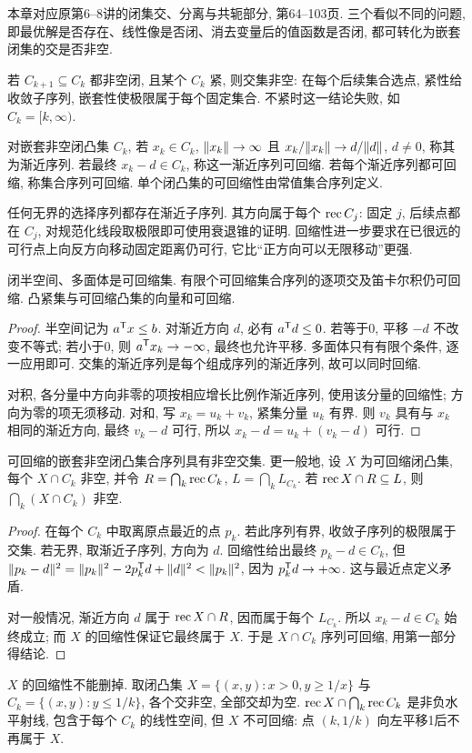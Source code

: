 \label{chap:3}
本章对应原第6--8讲的闭集交、分离与共轭部分, 第64--103页. 三个看似不同的问题, 即最优解是否存在、线性像是否闭、消去变量后的值函数是否闭, 都可转化为嵌套闭集的交是否非空.

若 $C_{k+1}\subseteq C_k$ 都非空闭, 且某个 $C_k$ 紧, 则交集非空: 在每个后续集合选点, 紧性给收敛子序列, 嵌套性使极限属于每个固定集合. 不紧时这一结论失败, 如 $C_k=[k,\infty)$.

\begin{definition}
对嵌套非空闭凸集 $C_k$, 若 $x_k\in C_k$, $\lVert x_k\rVert\to\infty$ 且 $x_k/\lVert x_k\rVert\to d/\lVert d\rVert$, $d\ne0$, 称其为渐近序列. 若最终 $x_k-d\in C_k$, 称这一渐近序列可回缩. 若每个渐近序列都可回缩, 称集合序列可回缩. 单个闭凸集的可回缩性由常值集合序列定义.
\end{definition}
任何无界的选择序列都存在渐近子序列. 其方向属于每个 $\operatorname{rec} C_j$: 固定 $j$, 后续点都在 $C_j$, 对规范化线段取极限即可使用衰退锥的证明. 回缩性进一步要求在已很远的可行点上向反方向移动固定距离仍可行, 它比“正方向可以无限移动”更强.

\begin{lemma}
闭半空间、多面体是可回缩集. 有限个可回缩集合序列的逐项交及笛卡尔积仍可回缩. 凸紧集与可回缩凸集的向量和可回缩.
\end{lemma}
\begin{proof}
半空间记为 $a^{\mathsf T} x\le b$. 对渐近方向 $d$, 必有 $a^{\mathsf T} d\le0$. 若等于0, 平移 $-d$ 不改变不等式; 若小于0, 则 $a^{\mathsf T} x_k\to-\infty$, 最终也允许平移. 多面体只有有限个条件, 逐一应用即可. 交集的渐近序列是每个组成序列的渐近序列, 故可以同时回缩.

对积, 各分量中方向非零的项按相应增长比例作渐近序列, 使用该分量的回缩性; 方向为零的项无须移动. 对和, 写 $x_k=u_k+v_k$, 紧集分量 $u_k$ 有界. 则 $v_k$ 具有与 $x_k$ 相同的渐近方向, 最终 $v_k-d$ 可行, 所以 $x_k-d=u_k+(v_k-d)$ 可行.
\end{proof}
\begin{theorem}\label{thm:retractive-intersection}
可回缩的嵌套非空闭凸集合序列具有非空交集. 更一般地, 设 $X$ 为可回缩闭凸集, 每个 $X\cap C_k$ 非空, 并令 $R=\bigcap_k\operatorname{rec} C_k$, $L=\bigcap_kL_{C_k}$. 若 $\operatorname{rec} X\cap R\subseteq L$, 则 $\bigcap_k(X\cap C_k)$ 非空.
\end{theorem}
\begin{proof}
在每个 $C_k$ 中取离原点最近的点 $p_k$. 若此序列有界, 收敛子序列的极限属于交集. 若无界, 取渐近子序列, 方向为 $d$. 回缩性给出最终 $p_k-d\in C_k$, 但
$\lVert p_k-d\rVert^2=\lVert p_k\rVert^2-2p_k^{\mathsf T} d+\lVert d\rVert^2<\lVert p_k\rVert^2$, 因为 $p_k^{\mathsf T} d\to+\infty$. 这与最近点定义矛盾.

对一般情况, 渐近方向 $d$ 属于 $\operatorname{rec} X\cap R$, 因而属于每个 $L_{C_k}$. 所以 $x_k-d\in C_k$ 始终成立; 而 $X$ 的回缩性保证它最终属于 $X$. 于是 $X\cap C_k$ 序列可回缩, 用第一部分得结论.
\end{proof}
$X$ 的回缩性不能删掉. 取闭凸集 $X=\{(x,y):x>0,y\ge1/x\}$ 与 $C_k=\{(x,y):y\le1/k\}$, 各个交非空, 全部交却为空. $\operatorname{rec} X\cap\bigcap_k\operatorname{rec} C_k$ 是非负水平射线, 包含于每个 $C_k$ 的线性空间, 但 $X$ 不可回缩: 点 $(k,1/k)$ 向左平移1后不再属于 $X$.


